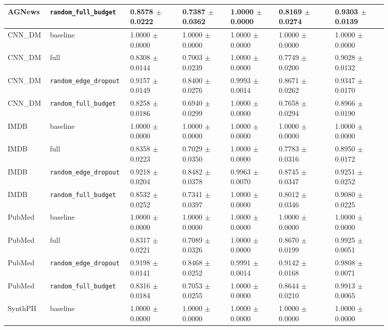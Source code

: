 \documentclass[preprint,12pt]{elsarticle}
\begin{document}
\begin{landscape}
\begin{longtable}{|L{0.07\linewidth}|L{0.15\linewidth}|C{0.13\linewidth}|C{0.12\linewidth}|C{0.12\linewidth}|C{0.14\linewidth}|C{0.13\linewidth}|}
AGNews & \nolinkurl{random_full_budget} & 0.8578 $\pm$ 0.0222 & 0.7387 $\pm$ 0.0362 & 1.0000 $\pm$ 0.0000 & 0.8169 $\pm$ 0.0274 & 0.9303 $\pm$ 0.0139 \\ \hline
CNN\_DM & baseline & 1.0000 $\pm$ 0.0000 & 1.0000 $\pm$ 0.0000 & 1.0000 $\pm$ 0.0000 & 1.0000 $\pm$ 0.0000 & 1.0000 $\pm$ 0.0000 \\ \hline
CNN\_DM & full & 0.8308 $\pm$ 0.0144 & 0.7003 $\pm$ 0.0239 & 1.0000 $\pm$ 0.0000 & 0.7749 $\pm$ 0.0200 & 0.9028 $\pm$ 0.0132 \\ \hline
CNN\_DM & \nolinkurl{random_edge_dropout} & 0.9157 $\pm$ 0.0149 & 0.8400 $\pm$ 0.0276 & 0.9993 $\pm$ 0.0014 & 0.8671 $\pm$ 0.0262 & 0.9347 $\pm$ 0.0170 \\ \hline
CNN\_DM & \nolinkurl{random_full_budget} & 0.8258 $\pm$ 0.0186 & 0.6940 $\pm$ 0.0299 & 1.0000 $\pm$ 0.0000 & 0.7658 $\pm$ 0.0294 & 0.8966 $\pm$ 0.0190 \\ \hline
IMDB & baseline & 1.0000 $\pm$ 0.0000 & 1.0000 $\pm$ 0.0000 & 1.0000 $\pm$ 0.0000 & 1.0000 $\pm$ 0.0000 & 1.0000 $\pm$ 0.0000 \\ \hline
IMDB & full & 0.8358 $\pm$ 0.0223 & 0.7029 $\pm$ 0.0350 & 1.0000 $\pm$ 0.0000 & 0.7783 $\pm$ 0.0316 & 0.8950 $\pm$ 0.0172 \\ \hline
IMDB & \nolinkurl{random_edge_dropout} & 0.9218 $\pm$ 0.0204 & 0.8482 $\pm$ 0.0378 & 0.9963 $\pm$ 0.0070 & 0.8745 $\pm$ 0.0347 & 0.9251 $\pm$ 0.0252 \\ \hline
IMDB & \nolinkurl{random_full_budget} & 0.8532 $\pm$ 0.0252 & 0.7341 $\pm$ 0.0397 & 1.0000 $\pm$ 0.0000 & 0.8012 $\pm$ 0.0346 & 0.9080 $\pm$ 0.0225 \\ \hline
PubMed & baseline & 1.0000 $\pm$ 0.0000 & 1.0000 $\pm$ 0.0000 & 1.0000 $\pm$ 0.0000 & 1.0000 $\pm$ 0.0000 & 1.0000 $\pm$ 0.0000 \\ \hline
PubMed & full & 0.8317 $\pm$ 0.0221 & 0.7089 $\pm$ 0.0326 & 1.0000 $\pm$ 0.0000 & 0.8670 $\pm$ 0.0199 & 0.9925 $\pm$ 0.0051 \\ \hline
PubMed & \nolinkurl{random_edge_dropout} & 0.9198 $\pm$ 0.0141 & 0.8468 $\pm$ 0.0252 & 0.9991 $\pm$ 0.0014 & 0.9142 $\pm$ 0.0168 & 0.9808 $\pm$ 0.0071 \\ \hline
PubMed & \nolinkurl{random_full_budget} & 0.8316 $\pm$ 0.0184 & 0.7053 $\pm$ 0.0255 & 1.0000 $\pm$ 0.0000 & 0.8644 $\pm$ 0.0210 & 0.9913 $\pm$ 0.0065 \\ \hline
SynthPII & baseline & 1.0000 $\pm$ 0.0000 & 1.0000 $\pm$ 0.0000 & 1.0000 $\pm$ 0.0000 & 1.0000 $\pm$ 0.0000 & 1.0000 $\pm$ 0.0000 \\ \hline

\end{longtable}
\end{landscape}
\end{document}
